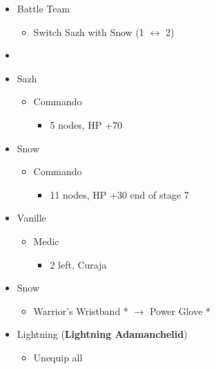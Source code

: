\begin{menu}
\begin{itemize}
    \paradigm
    \begin{itemize}
        \item Battle Team
        \begin{itemize}
            \item Switch Sazh with Snow (1 $\leftrightarrow$ 2)
        \end{itemize}
        \item {}%
{\paradigmline{(\rav)}{\com}{\com}}%
{\paradigmline[2]{\textit{\com}}{\textit{\com}}{\textit{\com}}}%
{\paradigmline{(\rav)}{\sen}{(\rav)}}%
{\paradigmline{(\com)}{(\sen)}{\med}}%
{\paradigmline{\rav}{(\com)}{(\rav)}}%
{\paradigmline{\rav}{\rav}{\rav}}
    \end{itemize}
    \crystarium
    \begin{itemize}
        \item Sazh
        \begin{itemize}
            \item Commando
            \begin{itemize}
                \item 5 nodes, HP +70
            \end{itemize}
        \end{itemize}
        \item Snow
        \begin{itemize}
            \item Commando
            \begin{itemize}
                \item 11 nodes, HP +30 end of stage 7
            \end{itemize}
        \end{itemize}
        \item Vanille
        \begin{itemize}
            \item Medic
            \begin{itemize}
                \item 2 left, Curaja
            \end{itemize}
        \end{itemize}
    \end{itemize}
    \equip
    \begin{itemize}
        \item Snow
        \begin{itemize}
            \item Warrior's Wristband * $\rightarrow$ Power Glove *
        \end{itemize}
        \item Lightning ({\bf Lightning Adamanchelid})
        \begin{itemize}
            \item Unequip all
        \end{itemize}
    \end{itemize}
\end{itemize}
\end{menu}
